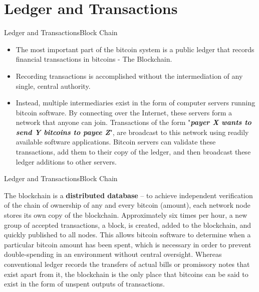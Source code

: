 \documentclass[handout]{beamer}
\begin{document}
\section{Ledger and Transactions}

\begin{frame}{Ledger and Transactions}{Block Chain}

  \begin{itemize}   
  \item<1-> The most important part of the bitcoin system is a public ledger that records financial transactions in bitcoins - The Blockchain.

  \item<2-> Recording transactions is accomplished without the intermediation of any single, central authority. 

 \item<3-> Instead, multiple intermediaries exist in the form of computer servers running bitcoin software. By connecting over the Internet, these servers form a network that anyone can join. Transactions of the form "\textbf{\textit{payer X wants to send Y bitcoins to payee Z}}", are broadcast to this network using readily available software applications. Bitcoin servers can validate these transactions, add them to their copy of the ledger, and then broadcast these ledger additions to other servers.

  \end{itemize}
\end{frame}


\begin{frame}{Ledger and Transactions}{Block Chain}

\begin{block}{}
The blockchain is a \textbf{distributed database} – to achieve independent verification of the chain of ownership of any and every bitcoin (amount), each network node stores its own copy of the blockchain. Approximately six times per hour, a new group of accepted transactions, a block, is created, added to the blockchain, and quickly published to all nodes. This allows bitcoin software to determine when a particular bitcoin amount has been spent, which is necessary in order to prevent double-spending in an environment without central oversight. Whereas conventional ledger records the transfers of actual bills or promissory notes that exist apart from it, the blockchain is the only place that bitcoins can be said to exist in the form of unspent outputs of transactions.

\end{block}
\end{frame}
\end{document}
